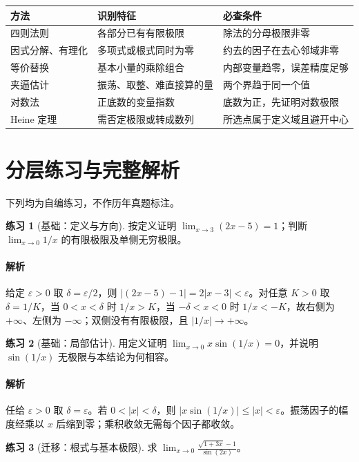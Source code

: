 \documentclass[UTF8,fontset=fandol,12pt,oneside,openany]{ctexrep}
\theoremstyle{definition}
\newtheorem{exercise}{练习}[chapter]
\begin{document}
\begin{center}
\begin{tabular}{p{}p{}p{}}
\toprule
方法 & 识别特征 & 必查条件\\
\midrule
四则法则 & 各部分已有有限极限 & 除法的分母极限非零\\
因式分解、有理化 & 多项式或根式同时为零 & 约去的因子在去心邻域非零\\
等价替换 & 基本小量的乘除组合 & 内部变量趋零，误差精度足够\\
夹逼估计 & 振荡、取整、难直接算的量 & 两个界趋于同一个值\\
对数法 & 正底数的变量指数 & 底数为正，先证明对数极限\\
Heine 定理 & 需否定极限或转成数列 & 所选点属于定义域且避开中心\\
\bottomrule
\end{tabular}
\end{center}

\section{分层练习与完整解析}
下列均为自编练习，不作历年真题标注。
\begin{exercise}[基础：定义与方向]
按定义证明 $\lim_{x\to3}(2x-5)=1$；判断 $\lim_{x\to0}1/x$ 的有限极限及单侧无穷极限。
\end{exercise}
\paragraph{解析}给定 $\varepsilon>0$ 取 $\delta=\varepsilon/2$，则 $|(2x-5)-1|=2|x-3|<\varepsilon$。对任意 $K>0$ 取 $\delta=1/K$，当 $0<x<\delta$ 时 $1/x>K$，当 $-\delta<x<0$ 时 $1/x<-K$，故右侧为 $+\infty$、左侧为 $-\infty$；双侧没有有限极限，且 $|1/x|\to+\infty$。

\begin{exercise}[基础：局部估计]
用定义证明 $\lim_{x\to0}x\sin(1/x)=0$，并说明 $\sin(1/x)$ 无极限与本结论为何相容。
\end{exercise}
\paragraph{解析}任给 $\varepsilon>0$ 取 $\delta=\varepsilon$。若 $0<|x|<\delta$，则 $|x\sin(1/x)|\le|x|<\varepsilon$。振荡因子的幅度经乘以 $x$ 后缩到零；乘积收敛无需每个因子都收敛。

\begin{exercise}[迁移：根式与基本极限]
求 $\displaystyle\lim_{x\to0}\frac{\sqrt{1+3x}-1}{\sin(2x)}$。
\end{exercise}
\end{document}
